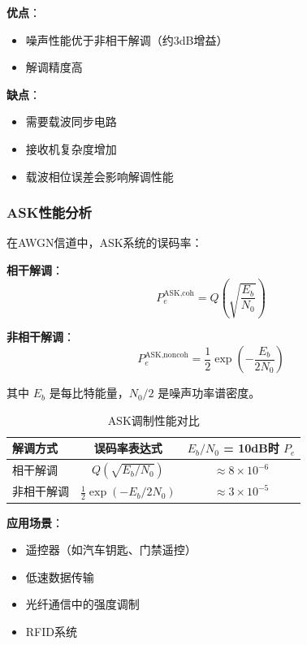 \textbf{优点}：
\begin{itemize}
    \item 噪声性能优于非相干解调（约3dB增益）
    \item 解调精度高
\end{itemize}

\textbf{缺点}：
\begin{itemize}
    \item 需要载波同步电路
    \item 接收机复杂度增加
    \item 载波相位误差会影响解调性能
\end{itemize}

\subsubsection{ASK性能分析}

在AWGN信道中，ASK系统的误码率：

\textbf{相干解调}：
\begin{equation}
    P_e^{\text{ASK,coh}} = Q\left(\sqrt{\frac{E_b}{N_0}}\right)
\end{equation}

\textbf{非相干解调}：
\begin{equation}
    P_e^{\text{ASK,noncoh}} = \frac{1}{2}\exp\left(-\frac{E_b}{2N_0}\right)
\end{equation}

其中 $E_b$ 是每比特能量，$N_0/2$ 是噪声功率谱密度。

\begin{table}[htbp]
    \centering
    \caption{ASK调制性能对比}
    \begin{tabular}{l|c|c}
        \hline
        解调方式 & 误码率表达式 & $E_b/N_0$ = 10dB时 $P_e$ \\
        \hline
        相干解调 & $Q(\sqrt{E_b/N_0})$ & $\approx 8 \times 10^{-6}$ \\
        非相干解调 & $\frac{1}{2}\exp(-E_b/2N_0)$ & $\approx 3 \times 10^{-5}$ \\
        \hline
    \end{tabular}
    \label{tab:ask_performance}
\end{table}

\textbf{应用场景}：
\begin{itemize}
    \item 遥控器（如汽车钥匙、门禁遥控）
    \item 低速数据传输
    \item 光纤通信中的强度调制
    \item RFID系统
\end{itemize}

